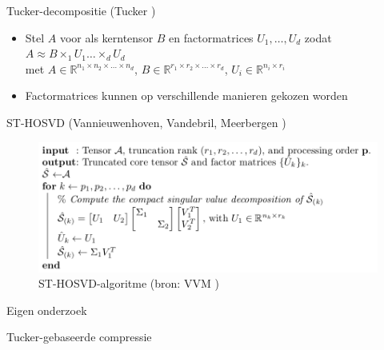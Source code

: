 \documentclass[t,12pt,dutch
\ifx\beamermode\undefined\else,\beamermode\fi
]{beamer}
\begin{document}
\begin{frame}{Tucker-decompositie (Tucker \cite{ref:tucker})}

\begin{itemize}
\item Stel $A$ voor als kerntensor $B$ en factormatrices $U_1, \dots, U_d$ zodat\\
$A \approx B \times_1 U_1 \dots \times_d U_d$\\
met $A \in \mathbb{R}^{n_1 \times n_2 \times \dots \times n_d}$, $B \in \mathbb{R}^{r_1 \times r_2 \times \dots \times r_d}$, $U_i \in \mathbb{R}^{n_i \times r_i}$
\item Factormatrices kunnen op verschillende manieren gekozen worden
\end{itemize}

\end{frame}

\begin{frame}{ST-HOSVD (Vannieuwenhoven, Vandebril, Meerbergen \cite{ref:st_hosvd})}

\begin{figure}[H]
\centering
\includegraphics[scale=0.35]{images/ST-HOSVD.png}
\caption{ST-HOSVD-algoritme (bron: VVM \cite{ref:st_hosvd})}
\end{figure}

\end{frame}


\begin{frame}{}
\begin{center}
\vspace*{\fill}
\vspace*{\fill}
\Huge
Eigen onderzoek
\normalsize
\vspace*{\fill}
\end{center}
\end{frame}


\begin{frame}{}
\begin{center}
\vspace*{\fill}
\vspace*{\fill}
\Huge
Tucker-gebaseerde compressie
\normalsize
\vspace*{\fill}
\end{center}
\end{frame}
\end{document}
